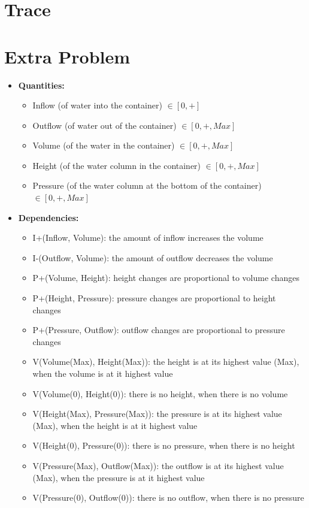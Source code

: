 \documentclass[a4paper]{article}
\begin{document}
\section{Trace}


\section{Extra Problem}

\begin{itemize}
\item \textbf{Quantities:}
\begin{itemize}
\item Inflow (of water into the container) $\in [0, +]$
\item Outflow (of water out of the container) $\in [0, +, Max]$
\item Volume (of the water in the container) $\in [0, +, Max]$
\item Height (of the water column in the container) $\in [0, +, Max]$
\item Pressure (of the water column at the bottom of the container) $\in [0, +, Max]$
\end{itemize}

\item \textbf{Dependencies:}

\begin{itemize}
\item I+(Inflow, Volume): the amount of inflow increases the volume
\item I-(Outflow, Volume): the amount of outflow decreases the volume
\item P+(Volume, Height): height changes are proportional to volume changes
\item P+(Height, Pressure): pressure changes are proportional to height changes
\item P+(Pressure, Outflow): outflow changes are proportional to pressure changes
\item V(Volume(Max), Height(Max)): the height is at its highest value (Max), when the volume is at it highest value
\item V(Volume(0), Height(0)): there is no height, when there is no volume
\item V(Height(Max), Pressure(Max)): the pressure is at its highest value (Max), when the height is at it highest value
\item V(Height(0), Pressure(0)): there is no pressure, when there is no height
\item V(Pressure(Max), Outflow(Max)): the outflow is at its highest value (Max), when the pressure is at it highest value
\item V(Pressure(0), Outflow(0)): there is no outflow, when there is no pressure
\end{itemize}
\end{itemize}
\end{document}
